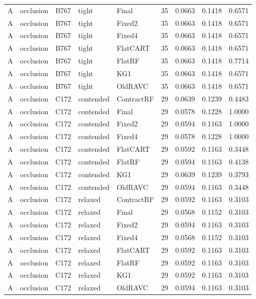 \begin{longtable}{@{}lllllllll@{}}
A & occlusion & B767 & tight & Final & 35 & 0.0663 & 0.1418 & 0.6571\\
A & occlusion & B767 & tight & Fixed2 & 35 & 0.0663 & 0.1418 & 0.6571\\
A & occlusion & B767 & tight & Fixed4 & 35 & 0.0663 & 0.1418 & 0.6571\\
A & occlusion & B767 & tight & FlatCART & 35 & 0.0663 & 0.1418 & 0.6571\\
A & occlusion & B767 & tight & FlatRF & 35 & 0.0663 & 0.1418 & 0.7714\\
A & occlusion & B767 & tight & KG1 & 35 & 0.0663 & 0.1418 & 0.6571\\
A & occlusion & B767 & tight & OldRAVC & 35 & 0.0663 & 0.1418 & 0.6571\\
A & occlusion & C172 & contended & ContractRF & 29 & 0.0639 & 0.1239 & 0.4483\\
A & occlusion & C172 & contended & Final & 29 & 0.0578 & 0.1228 & 1.0000\\
A & occlusion & C172 & contended & Fixed2 & 29 & 0.0594 & 0.1163 & 1.0000\\
A & occlusion & C172 & contended & Fixed4 & 29 & 0.0578 & 0.1228 & 1.0000\\
A & occlusion & C172 & contended & FlatCART & 29 & 0.0592 & 0.1163 & 0.3448\\
A & occlusion & C172 & contended & FlatRF & 29 & 0.0594 & 0.1163 & 0.4138\\
A & occlusion & C172 & contended & KG1 & 29 & 0.0639 & 0.1239 & 0.3793\\
A & occlusion & C172 & contended & OldRAVC & 29 & 0.0594 & 0.1163 & 0.3448\\
A & occlusion & C172 & relaxed & ContractRF & 29 & 0.0592 & 0.1163 & 0.3103\\
A & occlusion & C172 & relaxed & Final & 29 & 0.0568 & 0.1152 & 0.3103\\
A & occlusion & C172 & relaxed & Fixed2 & 29 & 0.0594 & 0.1163 & 0.3103\\
A & occlusion & C172 & relaxed & Fixed4 & 29 & 0.0568 & 0.1152 & 0.3103\\
A & occlusion & C172 & relaxed & FlatCART & 29 & 0.0592 & 0.1163 & 0.3103\\
A & occlusion & C172 & relaxed & FlatRF & 29 & 0.0592 & 0.1163 & 0.3103\\
A & occlusion & C172 & relaxed & KG1 & 29 & 0.0592 & 0.1163 & 0.3103\\
A & occlusion & C172 & relaxed & OldRAVC & 29 & 0.0594 & 0.1163 & 0.3103\\

\end{longtable}
